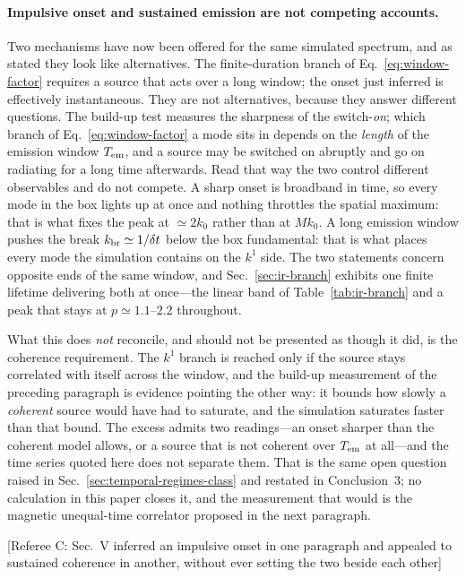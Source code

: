 \documentclass[10pt,prd,aps,nobibnotes,superscriptaddress,preprintnumbers,notitlepage]{revtex4-1}
\newcommand{\add}[1]{{\color{red}#1}}
\newcommand{\why}[1]{{\color{red}\footnotesize\textsf{[#1]}}}
\newcommand{\add}[1]{#1}
\newcommand{\why}[1]{}
\begin{document}
\add{\paragraph{Impulsive onset and sustained emission are not competing accounts.}
Two mechanisms have now been offered for the same simulated spectrum, and as stated they
look like alternatives. The finite-duration branch of Eq.~\eqref{eq:window-factor} requires
a source that acts over a long window; the onset just inferred is effectively instantaneous.
They are not alternatives, because they answer different questions. The build-up test
measures the sharpness of the switch-\emph{on}; which branch of
Eq.~\eqref{eq:window-factor} a mode sits in depends on the \emph{length} of the emission
window $T_{\rm em}$, and a source may be switched on abruptly and go on radiating for a
long time afterwards. Read that way the two control different observables and do not
compete. A sharp onset is broadband in time, so every mode in the box lights up at once and
nothing throttles the spatial maximum: that is what fixes the peak at $\simeq2k_0$ rather
than at $Mk_0$. A long emission window pushes the break $k_{\rm br}\simeq1/\delta t$
\cite{RoperPol:2022iel,RoperPol:2023dzg} below the box fundamental: that is what places
every mode the simulation contains on the $k^{1}$ side. The two statements concern opposite
ends of the same window, and Sec.~\ref{sec:ir-branch} exhibits one finite lifetime
delivering both at once---the linear band of Table~\ref{tab:ir-branch} and a peak that
stays at $p\simeq1.1$--$2.2$ throughout.

What this does \emph{not} reconcile, and should not be presented as though it did, is the
coherence requirement. The $k^{1}$ branch is reached only if the source stays correlated
with itself across the window, and the build-up measurement of the preceding paragraph is
evidence pointing the other way: it bounds how slowly a \emph{coherent} source would have
had to saturate, and the simulation saturates faster than that bound. The excess admits two
readings---an onset sharper than the coherent model allows, or a source that is not
coherent over $T_{\rm em}$ at all---and the time series quoted here does not separate them.
That is the same open question raised in Sec.~\ref{sec:temporal-regimes-class} and restated
in Conclusion~3; no calculation in this paper closes it, and the measurement that would is
the magnetic unequal-time correlator proposed in the next paragraph.}
\why{Referee C: Sec.~V inferred an impulsive onset in one paragraph and appealed to
sustained coherence in another, without ever setting the two beside each other}
\end{document}

